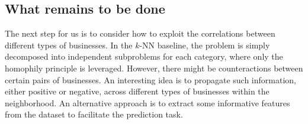 \subsection{What remains to be done}

The next step for us is to consider how to exploit the correlations between different types of businesses. In the $k$-NN baseline, the problem is simply decomposed into independent subproblems for each category, where only the homophily principle is leveraged. However, there might be counteractions between certain pairs of businesses. An interesting idea is to propagate such information, either positive or negative, across different types of businesses within the neighborhood. An alternative approach is to extract some informative features from the dataset to facilitate the prediction task. 
